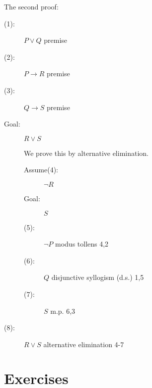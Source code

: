 \documentclass[12pt]{article}
\begin{document}
\newpage

The second proof:

\begin{description}

\item[(1):]  $P \vee Q$  premise

\item[(2):]  $P \rightarrow R$ premise

\item[(3):]  $Q \rightarrow S$  premise

\item[Goal:]  $R \vee S$

We  prove this by alternative elimination.

\begin{description}

\item[Assume(4):] $\neg R$

\item[Goal:]  $S$

\item[(5):]  $\neg P$ modus tollens 4,2

\item[(6):]  $Q$ disjunctive syllogism (d.s.) 1,5

\item[(7):]  $S$ m.p. 6,3

\end{description}

\item[(8):]  $R \vee S$ alternative elimination 4-7

\end{description}

\newpage

\section{Exercises}
\end{document}
